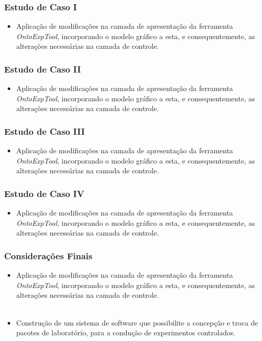 \documentclass[aspectratio=169]{beamer}
\begin{document}
\begin{frame}
\frametitle{Estudo de Caso I}
\justifying
\begin{itemize}
\item Aplicação de modificações na camada de apresentação da ferramenta \textit{OntoExpTool}, incorporando o modelo gráfico a esta, e consequentemente, as alterações necessárias na camada de controle.
\end{itemize}

\end{frame}

\begin{frame}
\frametitle{Estudo de Caso II}
\justifying
\begin{itemize}
\item Aplicação de modificações na camada de apresentação da ferramenta \textit{OntoExpTool}, incorporando o modelo gráfico a esta, e consequentemente, as alterações necessárias na camada de controle.
\end{itemize}

\end{frame}

\begin{frame}
\frametitle{Estudo de Caso III}
\justifying
\begin{itemize}
\item Aplicação de modificações na camada de apresentação da ferramenta \textit{OntoExpTool}, incorporando o modelo gráfico a esta, e consequentemente, as alterações necessárias na camada de controle.
\end{itemize}

\end{frame}

\begin{frame}
\frametitle{Estudo de Caso IV}
\justifying
\begin{itemize}
\item Aplicação de modificações na camada de apresentação da ferramenta \textit{OntoExpTool}, incorporando o modelo gráfico a esta, e consequentemente, as alterações necessárias na camada de controle.
\end{itemize}

\end{frame}

\begin{frame}
\frametitle{Considerações Finais}
\justifying

\begin{itemize}
\item Aplicação de modificações na camada de apresentação da ferramenta \textit{OntoExpTool}, incorporando o modelo gráfico a esta, e consequentemente, as alterações necessárias na camada de controle.
\\~\\
\item Construção de um sistema de software que possibilite a concepção e troca de pacotes de laboratório, para a condução de experimentos controlados.


\end{itemize}


\end{frame}
\end{document}

